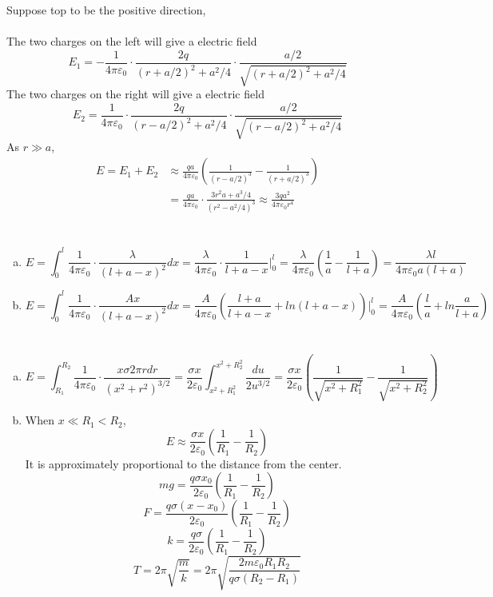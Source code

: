\documentclass{article}
\begin{document}
\section{}
Suppose top to be the positive direction,\\
\\
The two charges on the left will give a electric field
$$E_1=-\frac{1}{4\pi\varepsilon_0}\cdot\frac{2q}{(r+a/2)^2+a^2/4}\cdot\frac{a/2}{\sqrt{(r+a/2)^2+a^2/4}}$$
The two charges on the right will give a electric field
$$E_2=\frac{1}{4\pi\varepsilon_0}\cdot\frac{2q}{(r-a/2)^2+a^2/4}\cdot\frac{a/2}{\sqrt{(r-a/2)^2+a^2/4}}$$
As $r\gg a$,
\begin{align*}
E=E_1+E_2&\approx\frac{qa}{4\pi\varepsilon_0}\left(\frac{1}{(r-a/2)^3}-\frac{1}{(r+a/2)^3}\right)\\
&=\frac{qa}{4\pi\varepsilon_0}\cdot\frac{3r^2a+a^3/4}{(r^2-a^2/4)^3}
\approx\frac{3qa^2}{4\pi\varepsilon_0r^4}
\end{align*}

\section{}
\begin{enumerate}[(a)]
\item
$$E=\int_0^l\frac{1}{4\pi\varepsilon_0}\cdot\frac{\lambda}{(l+a-x)^2}dx=\frac{\lambda}{4\pi\varepsilon_0}\cdot\frac{1}{l+a-x}\bigg|_0^l=\frac{\lambda}{4\pi\varepsilon_0}\left(\frac{1}{a}-\frac{1}{l+a}\right)
=\frac{\lambda l}{4\pi\varepsilon_0a(l+a)}$$
\item
$$E=\int_0^l\frac{1}{4\pi\varepsilon_0}\cdot\frac{Ax}{(l+a-x)^2}dx
=\frac{A}{4\pi\varepsilon_0}\left(\frac{l+a}{l+a-x}+ln(l+a-x)\right)\bigg|_0^l
=\frac{A}{4\pi\varepsilon_0}\left(\frac{l}{a}+ln\frac{a}{l+a}\right)$$
\end{enumerate}

\section{}
\begin{enumerate}[(a)]
\item
$$E=\int_{R_1}^{R_2}\frac{1}{4\pi\varepsilon_0}\cdot\frac{x\sigma2\pi rdr}{(x^2+r^2)^{3/2}}
=\frac{\sigma x}{2\varepsilon_0}\int_{x^2+R_1^2}^{x^2+R_2^2}\frac{du}{2u^{3/2}}
=\frac{\sigma x}{2\varepsilon_0}\left(\frac{1}{\sqrt{x^2+R_1^2}}-\frac{1}{\sqrt{x^2+R_2^2}}\right)$$

\item
When $x\ll R_1<R_2$,
$$E\approx\frac{\sigma x}{2\varepsilon_0}\left(\frac{1}{R_1}-\frac{1}{R_2}\right)$$
It is approximately proportional to the distance from the center.
$$mg=\frac{q\sigma x_0}{2\varepsilon_0}\left(\frac{1}{R_1}-\frac{1}{R_2}\right)$$
$$F=\frac{q\sigma(x-x_0)}{2\varepsilon_0}\left(\frac{1}{R_1}-\frac{1}{R_2}\right)$$
$$k=\frac{q\sigma}{2\varepsilon_0}\left(\frac{1}{R_1}-\frac{1}{R_2}\right)$$
$$T=2\pi\sqrt{\frac{m}{k}}=2\pi\sqrt{\frac{2m\varepsilon_0R_1R_2}{q\sigma(R_2-R_1)}}$$
\end{enumerate}
\end{document}
